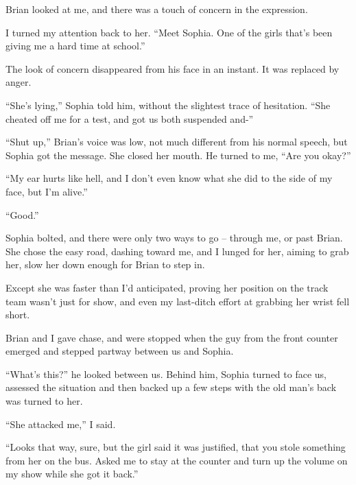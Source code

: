 Brian looked at me, and there was a touch of concern in the expression.



I turned my attention back to her.  ``Meet Sophia.  One of the girls that's been giving me a hard time at school.''



The look of concern disappeared from his face in an instant.  It was replaced by anger.



``She's lying,'' Sophia told him, without the slightest trace of hesitation. ``She cheated off me for a test, and got us both suspended and-''



``Shut up,'' Brian's voice was low, not much different from his normal speech, but Sophia got the message.  She closed her mouth.  He turned to me, ``Are you okay?''



``My ear hurts like hell, and I don't even know what she did to the side of my face, but I'm alive.''



``Good.''



Sophia bolted, and there were only two ways to go – through me, or past Brian.  She chose the easy road, dashing toward me, and I lunged for her, aiming to grab her, slow her down enough for Brian to step in.



Except she was faster than I'd anticipated, proving her position on the track team wasn't just for show, and even my last-ditch effort at grabbing her wrist fell short.



Brian and I gave chase, and were stopped when the guy from the front counter emerged and stepped partway between us and Sophia.



``What's this?'' he looked between us.  Behind him, Sophia turned to face us, assessed the situation and then backed up a few steps with the old man's back was turned to her.



``She attacked me,'' I said.



``Looks that way, sure, but the girl said it was justified, that you stole something from her on the bus.  Asked me to stay at the counter and turn up the volume on my show while she got it back.''



